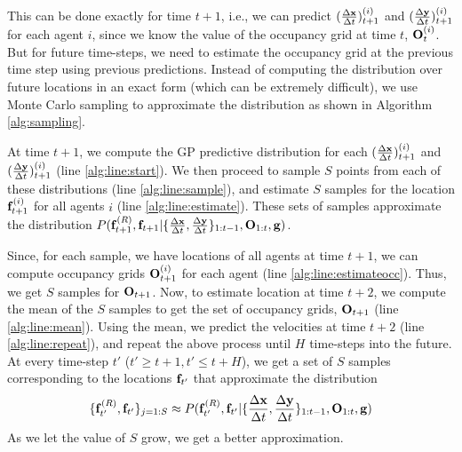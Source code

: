 This can be done exactly for time $t+1$, i.e., we can predict
$(\frac{\Delta \mathbf{x}}{\Delta t})_{t+1}^{(i)}$ and $(\frac{\Delta \mathbf{y}}{\Delta t})_{t+1}^{(i)}$ for each agent $i$,
since we know the value of the occupancy grid at time $t$,
$\mathbf{O}^{(i)}_t$. But for future time-steps, we need to estimate the
occupancy grid at the previous time step using previous
predictions. Instead of computing the distribution over future
locations in an exact form (which can be extremely difficult), we use
Monte Carlo sampling to approximate the distribution as shown in
Algorithm \ref{alg:sampling}.

At time $t+1$, we compute the GP predictive distribution
\cite{rasmussen06} for each $(\frac{\Delta \mathbf{x}}{\Delta t})_{t+1}^{(i)}$ and
$(\frac{\Delta \mathbf{y}}{\Delta t})_{t+1}^{(i)}$ (line \ref{alg:line:start}).
%
%
%
%
%
We then proceed to sample $S$ points from each of these distributions
(line \ref{alg:line:sample}), and estimate $S$ samples for the
location $\mathbf{f}_{t+1}^{(i)}$ for all agents $i$ (line
\ref{alg:line:estimate}).  These sets of samples approximate the
distribution
$P(\mathbf{f}^{(R)}_{t+1}, \mathbf{f}_{t+1}|\{\frac{\Delta \mathbf{x}}{\Delta t}, \frac{\Delta \mathbf{y}}{\Delta t}\}_{1:t-1},
\mathbf{O}_{1:t}, \mathbf{g})$.

Since, for each sample, we have locations of all agents at time $t+1$,
we can compute occupancy grids $\mathbf{O}^{(i)}_{t+1}$ for each agent
(line \ref{alg:line:estimateocc}). Thus, we get $S$ samples for
$\mathbf{O}_{t+1}$.  Now, to estimate location at time $t+2$, we compute
the mean of the $S$ samples to get the set of occupancy grids,
$\mathbf{O}_{t+1}$ (line \ref{alg:line:mean}).  Using the mean,
%
we predict the velocities at time $t+2$ (line \ref{alg:line:repeat}),
and repeat the above process until $H$ time-steps into the future. At
every time-step $t'$ ($t' \geq t+1, t' \leq t+H$), we get a set of $S$
samples corresponding to the locations $\mathbf{f}_{t'}$ that approximate
the distribution
\begin{align*}
  \{\mathbf{f}^{(R)}_{t'}, \mathbf{f}_{t'}\}_{j=1:S} \approx P(\mathbf{f}^{(R)}_{t'}, \mathbf{f}_{t'}|\{\frac{\Delta \mathbf{x}}{\Delta t}, \frac{\Delta \mathbf{y}}{\Delta t}\}_{1:t-1}, \mathbf{O}_{1:t}, \mathbf{g})
\end{align*}
As we let the value of $S$ grow, we get a better approximation.


